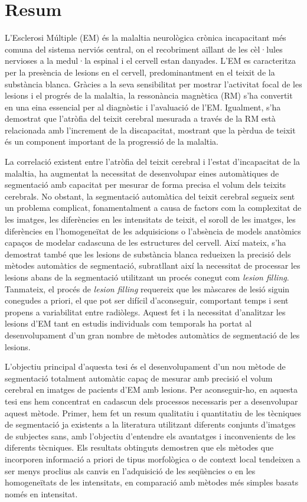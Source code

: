 \chapter*{Resum}

L'Esclerosi Múltiple (EM)  és la malaltia neurològica crònica incapacitant més comuna del sistema nerviós central, on el recobriment aïllant de les cèl·lules nervioses a la medul·la espinal i el cervell estan danyades. L'EM es caracteritza per la presència de lesions en el cervell, predominantment en el teixit de la substància blanca. Gràcies a la seva sensibilitat per mostrar l'activitat focal de les lesions i el progrés de la malaltia, la ressonància magnètica (RM) s'ha convertit en una eina essencial per al diagnòstic i l'avaluació de l'EM. Igualment, s'ha demostrat que l'atròfia del teixit cerebral mesurada a través de la RM està relacionada amb l'increment de la discapacitat, mostrant que la pèrdua de teixit és un component important de la progressió de la malaltia.

La correlació existent entre l'atròfia del teixit cerebral i l'estat d'incapacitat de la malaltia, ha augmentat la necessitat de desenvolupar eines automàtiques de segmentació amb capacitat per mesurar de forma precisa el volum dels teixits cerebrals. No obstant, la segmentació automàtica del teixit cerebral segueix sent un problema complicat, fonamentalment a causa de factors com la complexitat de les imatges, les diferències en les intensitats de teixit, el soroll de les imatges, les diferències en l'homogeneïtat de les adquisicions o l'absència de models anatòmics capaços de modelar cadascuna de les estructures del cervell. Així mateix, s'ha demostrat també que les lesions de substància blanca redueixen la precisió dels mètodes automàtics de segmentació, subratllant així la necessitat de processar les lesions abans de la segmentació utilitzant un procés conegut com \textit{lesion filling}. Tanmateix, el procés de \textit{lesion filling} requereix que les màscares de lesió siguin conegudes a priori, el que pot ser difícil d'aconseguir, comportant temps i sent propens a variabilitat entre radiòlegs. Aquest fet i la necessitat d'analitzar les lesions d'EM tant en estudis individuals com temporals ha portat al desenvolupament d'un gran nombre de mètodes automàtics de segmentació de les lesions.

L'objectiu principal d'aquesta tesi és el desenvolupament d'un nou mètode de segmentació totalment automàtic capaç de mesurar amb precisió el volum cerebral en imatges de pacients d'EM amb lesions. Per aconseguir-ho, en aquesta tesi ens hem concentrat en cadascun dels processos necessaris per a desenvolupar aquest mètode. Primer, hem fet un resum qualitatiu i quantitatiu de les tècniques de segmentació ja existents a la literatura utilitzant diferents conjunts d'imatges de subjectes sans, amb l'objectiu d'entendre els avantatges i inconvenients de les diferents tècniques. Els resultats obtinguts demostren que els mètodes que incorporen informació a priori de tipus morfològica o de context local tendeixen a ser menys proclius als canvis en l'adquisició de les seqüències o en les homogeneïtats de les intensitats, en comparació amb mètodes més simples basats només en intensitat.

